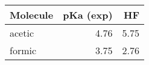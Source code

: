 \begin{tabular}{lrr}
\toprule
\textbf{Molecule} & \textbf{pKa (exp)} & \textbf{HF} \\
\midrule
acetic & 4.76 & 5.75 \\
formic & 3.75 & 2.76 \\
\bottomrule
\end{tabular}